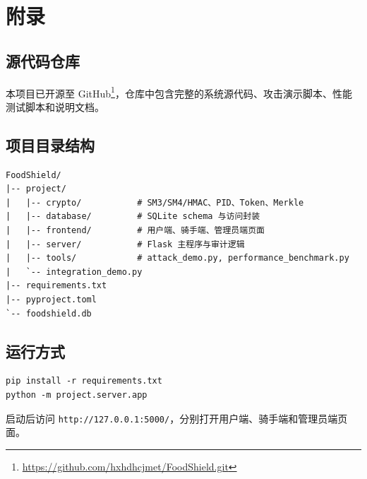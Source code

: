 \appendix
\section{附录}

\subsection{源代码仓库}

本项目已开源至 GitHub\footnote{\url{https://github.com/hxhdhcjmet/FoodShield.git}}，仓库中包含完整的系统源代码、攻击演示脚本、性能测试脚本和说明文档。

\subsection{项目目录结构}

\begin{verbatim}
FoodShield/
|-- project/
|   |-- crypto/           # SM3/SM4/HMAC、PID、Token、Merkle
|   |-- database/         # SQLite schema 与访问封装
|   |-- frontend/         # 用户端、骑手端、管理员端页面
|   |-- server/           # Flask 主程序与审计逻辑
|   |-- tools/            # attack_demo.py, performance_benchmark.py
|   `-- integration_demo.py
|-- requirements.txt
|-- pyproject.toml
`-- foodshield.db
\end{verbatim}

\subsection{运行方式}

\begin{verbatim}
pip install -r requirements.txt
python -m project.server.app
\end{verbatim}

启动后访问 \texttt{http://127.0.0.1:5000/}，分别打开用户端、骑手端和管理员端页面。
